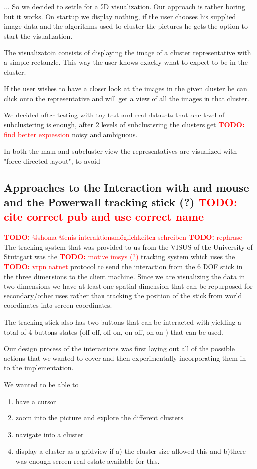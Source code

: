 \documentclass[journal]{vgtc}       %
\newcommand{\todo}[1]{\textcolor{red}{\textbf{TODO:} #1}}
\begin{document}
... So we decided to settle for a 2D visualization. Our approach is rather boring but it works. On startup we display nothing, if the user chooses his supplied image data and the algorithms used to cluster the pictures he gets the option to start the visualization.

The visualizatoin consists of displaying the image of a cluster representative with a simple rectangle. 
This way the user knows exactly what to expect to be in the cluster.

If the user wishes to have a closer look at the images in the given cluster he can click onto the representative and will get a view of all the images in that cluster.

We decided after testing with toy test and real datasets that one level of subclustering is enough, after 2 levels of subclustering the clusters get \todo{find better expression}  noisy and ambiguous.

In both the main and subcluster view the representatives are visualized with "force directed layout", to avoid 



\subsection{Approaches to the Interaction with and mouse and the Powerwall tracking stick (?) \todo{cite correct pub and use correct name}}

\todo{@shoma @enis interaktionsmöglichkeiten schreiben}
\todo{rephrase}
The tracking system that was provided to us from the VISUS of the University of Stuttgart was the \todo{motive imsys (?)} tracking system which uses the \todo{vrpn natnet} protocol to send the interaction from the 6 DOF stick in the three dimensions to the client machine. 
Since we are visualizing the data in two dimensions we have at least one spatial dimension that can be repurposed for secondary/other uses rather than tracking the position of the stick from world coordinates into screen coordinates.

The tracking stick also has two buttons that can be interacted with yielding a total of 4 buttons states (off off, off on, on off, on on ) that can be used.

Our design process of the interactions was first  laying out all of the possible actions that we wanted to cover and then experimentally incorporating them in to the implementation.

We wanted to be able to 
\begin{enumerate}
  \item have a cursor 
  \item zoom into the picture and  explore the different clusters
  \item navigate into a cluster
  \item display a cluster as a gridview if a) the cluster size allowed this and b)there was enough screen real estate available for this.
  
\end{enumerate}
\end{document}
